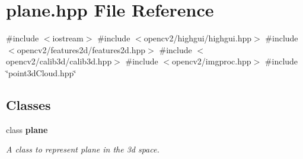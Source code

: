 \section{plane.\+hpp File Reference}
\label{plane_8hpp}
{\ttfamily \#include $<$iostream$>$}\newline
{\ttfamily \#include $<$opencv2/highgui/highgui.\+hpp$>$}\newline
{\ttfamily \#include $<$opencv2/features2d/features2d.\+hpp$>$}\newline
{\ttfamily \#include $<$opencv2/calib3d/calib3d.\+hpp$>$}\newline
{\ttfamily \#include $<$opencv2/imgproc.\+hpp$>$}\newline
{\ttfamily \#include \char`\"{}point3d\+Cloud.\+hpp\char`\"{}}\newline
\subsection*{Classes}
\begin{DoxyCompactItemize}
\item 
class \textbf{ plane}
\begin{DoxyCompactList}\small\item\em A class to represent plane in the 3d space. \end{DoxyCompactList}\end{DoxyCompactItemize}
